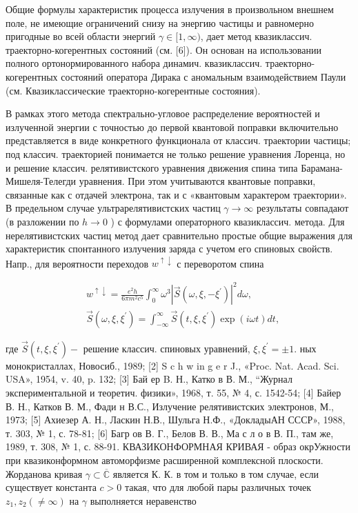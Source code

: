 \documentclass[10pt]{article}
\begin{document}
Общие формулы характеристик процесса излучения в произвольном внешнем поле, не имеющие ограничений снизу на энергию частицы и равномерно пригодные во всей области энергий $\gamma \in[1, \infty)$, дает метод квазиклассич. траекторно-когерентных состояний (см. [6]). Он основан на использовании полного ортонормированного набора динамич. квазиклассич. траекторно-когерентных состояний оператора Дирака с аномальным взаимодействием Паули (см. Квазиклассические траекторно-когерентные состояния).



В рамках этого метода спектрально-угловое распределение вероятностей и излученной энергии с точностью до первой квантовой поправки включительно представляется в виде конкретного функционала от классич. траектории частицы; под классич. траекторией понимается не только решение уравнения Лоренца, но и решение классич. релятивистского уравнения движения спина типа Барамана-Мишеля-Телегди уравнения. При этом учитываются квантовые поправки, связанные как с отдачей электрона, так и с «квантовым характером траектории». В предельном случае ультрарелятивистских частиц $\gamma \rightarrow \infty$ результаты совпадают (в разложении по $h \rightarrow 0$ ) с формулами операторного квазиклассич. метода. Для нерелятивистских частиц метод дает сравнительно простые общие выражения для характеристик спонтанного излучения заряда с учетом его спиновых свойств. Напр., для вероятности переходов $w^{\uparrow \downarrow}$ с переворотом спина



\[

\begin{aligned}

& w^{\uparrow \downarrow}=\frac{e^{2} h}{6 \pi m^{2} c^{5}} \int_{0}^{\infty} \omega^{3}\left|\vec{S}\left(\omega, \xi,-\xi^{\prime}\right)\right|^{2} d \omega, \\

& \vec{S}\left(\omega, \xi, \xi^{\prime}\right)=\int_{-\infty}^{\infty} \vec{S}\left(t, \xi, \xi^{\prime}\right) \exp (i \omega t) d t,

\end{aligned}

\]



где $\vec{S}\left(t, \xi, \xi^{\prime}\right)-$ решение классич. спиновых уравнений, $\xi, \xi^{\prime}= \pm 1$. ных монокристаллах, Новосиб., 1989; [2] S c h w in g e r J., «Proc. Nat. Acad. Sci. USA», 1954, v. 40, p. 132; [3] Бай ер B. Н., Катко в В. М., “Журнал экспериментальной и теоретич. физики», 1968, т. 55, № 4, с. 1542-54; [4] Байер В. Н., Катков В. М., Фади н В.С., Излучение релятивистских электронов, М., 1973; [5] Ахиезер А. Н., Ласкин Н.В., Шульга Н.Ф., «ДокладыАН СССР», 1988, т. 303, № 1, с. 78-81; [6] Багр ов В. Г., Белов В. В., Ма с л о в В. П., там же, 1989, т. 308, № 1, с. 88-91. КВАЗИКОНФОРМНАЯ КРИВАЯ - образ окрУжности при квазиконформном автоморфизме расширенной комплексной плоскости. Жорданова кривая $\gamma \subset \overline{\mathbb{C}}$ является К. К. в том и только в том случае, если существует константа $c>0$ такая, что для любой пары различных точек $z_{1}, z_{2}(\neq \infty)$ на $\gamma$ выполняется неравенство
\end{document}
